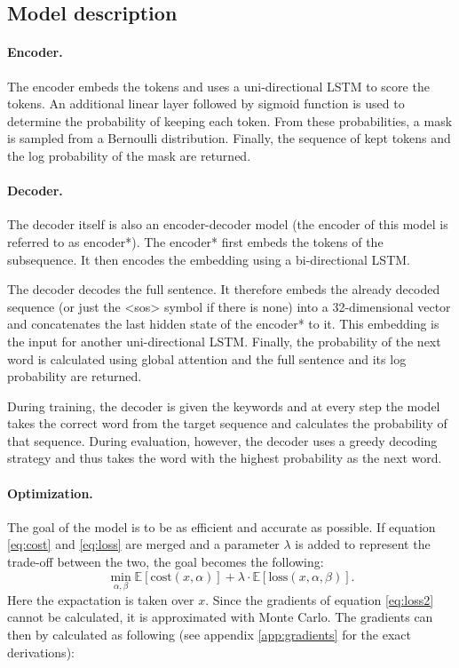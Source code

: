 \subsection{Model description}
\label{sec:model}
\paragraph{Encoder.} 
The encoder embeds the tokens and uses a uni-directional LSTM \cite{LSTM} to score the tokens.
An additional linear layer followed by sigmoid function is used to determine the probability of keeping each token. 
From these probabilities, a mask is sampled from a Bernoulli distribution. 
Finally, the sequence of kept tokens and the log probability of the mask are returned.

\paragraph{Decoder.} 
The decoder itself is also an encoder-decoder model (the encoder of this model is referred to as encoder*).
The encoder* first embeds the tokens of the subsequence.
It then encodes the embedding using a bi-directional LSTM. 

The decoder decodes the full sentence. 
It therefore embeds the already decoded sequence (or just the <sos> symbol if there is none) into a 32-dimensional vector and concatenates the last hidden state of the encoder* to it. 
This embedding is the input for another uni-directional LSTM. 
Finally, the probability of the next word is calculated using global attention \cite{LuongAttention, bahdanau2016neuralmachinetranslationjointly} and the full sentence and its log probability are returned. 

During training, the decoder is given the keywords and at every step the model takes the correct word from the target sequence and calculates the probability of that sequence.
During evaluation, however, the decoder uses a greedy decoding strategy and thus takes the word with the highest probability as the next word. 

\paragraph{Optimization.} 
The goal of the model is to be as efficient and accurate as possible. 
If equation \ref{eq:cost} and \ref{eq:loss} are merged and a parameter $\lambda$ is added to represent the trade-off between the two, the goal becomes the following:
\begin{equation}
    \label{eq:loss2}
    \min_{\alpha, \beta} \mathbb{E} [\text{cost}(x, \alpha)] + \lambda \cdot \mathbb{E}[\text{loss}(x, \alpha, \beta)].
\end{equation}
Here the expactation is taken over $x$. 
Since the gradients of equation \ref{eq:loss2} cannot be calculated, it is approximated with Monte Carlo.
The gradients can then by calculated as following (see appendix \ref{app:gradients} for the exact derivations):

